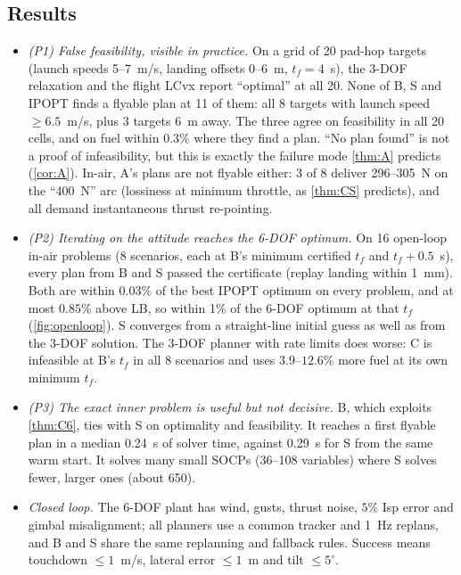 \subsection{Results}
\begin{itemize}[leftmargin=*,itemsep=2pt]
\item \emph{(P1) False feasibility, visible in practice.} On a grid of 20 pad-hop targets (launch speeds 5--7~m/s, landing offsets
0--6~m, $t_f=4$~s), the 3-DOF relaxation and the flight LCvx report ``optimal'' at all 20. None of B, S and IPOPT finds a flyable plan
at 11 of them: all 8 targets with launch speed $\ge6.5$~m/s, plus 3 targets 6~m away. The three agree on feasibility in all 20 cells,
and on fuel within $0.3\%$ where they find a plan. ``No plan found'' is not a proof of infeasibility, but this is exactly the failure
mode \cref{thm:A} predicts (\cref{cor:A}). In-air, A's plans are not flyable either: 3 of 8 deliver 296--305~N on the ``400~N''
arc (lossiness at minimum throttle, as \cref{thm:CS} predicts), and all demand instantaneous thrust re-pointing.
\item \emph{(P2) Iterating on the attitude reaches the 6-DOF optimum.} On 16 open-loop in-air problems (8 scenarios, each at B's
minimum certified $t_f$ and $t_f+0.5$~s), every plan from B and S passed the certificate (replay landing within 1~mm). Both are
within $0.03\%$ of the best IPOPT optimum on every problem, and at most $0.85\%$ above LB, so within 1\% of the 6-DOF optimum at
that $t_f$ (\cref{fig:openloop}). S converges from a straight-line initial guess as well as from the 3-DOF solution. The
3-DOF planner with rate limits does worse: C is infeasible at B's $t_f$ in all 8 scenarios and uses $3.9$--$12.6\%$ more fuel at its own
minimum $t_f$.
\item \emph{(P3) The exact inner problem is useful but not decisive.} B, which exploits \cref{thm:C6}, ties with S on optimality and
feasibility. It reaches a first flyable plan in a median 0.24~s of solver time, against 0.29~s for S from the same warm start. It
solves many small SOCPs (36--108 variables) where S solves fewer, larger ones (about 650).
\item \emph{Closed loop.} The 6-DOF plant has wind, gusts, thrust noise, $5\%$ Isp error and gimbal misalignment; all planners use
a common tracker and 1~Hz replans, and B and S share the same replanning and fallback rules. Success means touchdown $\le1$~m/s,
lateral error $\le1$~m and tilt $\le5^\circ$.
\begin{center}\small
\begin{tabular}{@{}lcccc@{}}\toprule

\end{tabular}
\end{center}
\end{itemize}

